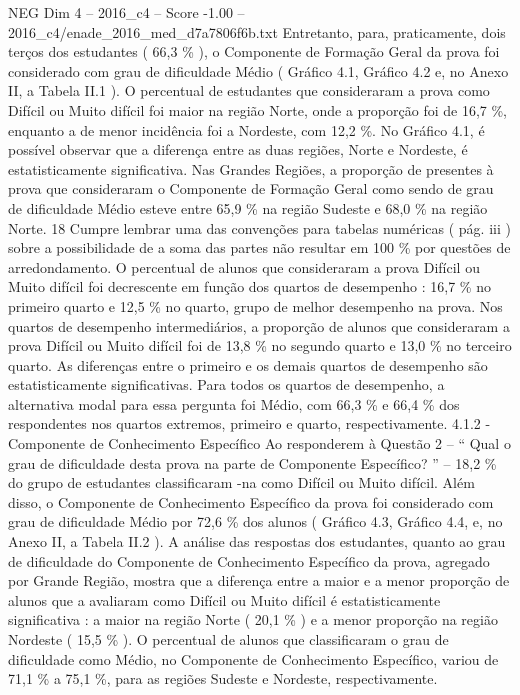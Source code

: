 \begin{textsample}{NEG Dim 4 – 2016\_c4 – Score -1.00 – 2016\_c4/enade\_2016\_med\_d7a7806f6b.txt}
Entretanto, para, praticamente, dois terços dos estudantes ( 66,3 \% ), o Componente de Formação Geral da prova foi considerado com grau de dificuldade Médio ( Gráfico 4.1, Gráfico 4.2 e, no Anexo II, a Tabela II.1 ).
O percentual de estudantes que consideraram a prova como Difícil ou Muito difícil foi maior na região Norte, onde a proporção foi de 16,7 \%, enquanto a de menor incidência foi a Nordeste, com 12,2 \%.
No Gráfico 4.1, é possível observar que a diferença entre as duas regiões, Norte e Nordeste, é estatisticamente significativa.
Nas Grandes Regiões, a proporção de presentes à prova que consideraram o Componente de Formação Geral como sendo de grau de dificuldade Médio esteve entre 65,9 \% na região Sudeste e 68,0 \% na região Norte. 18 Cumpre lembrar uma das convenções para tabelas numéricas ( pág. iii ) sobre a possibilidade de a soma das partes não resultar em 100 \% por questões de arredondamento.
O percentual de alunos que consideraram a prova Difícil ou Muito difícil foi decrescente em função dos quartos de desempenho : 16,7 \% no primeiro quarto e 12,5 \% no quarto, grupo de melhor desempenho na prova.
Nos quartos de desempenho intermediários, a proporção de alunos que consideraram a prova Difícil ou Muito difícil foi de 13,8 \% no segundo quarto e 13,0 \% no terceiro quarto.
As diferenças entre o primeiro e os demais quartos de desempenho são estatisticamente significativas.
Para todos os quartos de desempenho, a alternativa modal para essa pergunta foi Médio, com 66,3 \% e 66,4 \% dos respondentes nos quartos extremos, primeiro e quarto, respectivamente. 4.1.2 - Componente de Conhecimento Específico Ao responderem à Questão 2 – “ Qual o grau de dificuldade desta prova na parte de Componente Específico? ” – 18,2 \% do grupo de estudantes classificaram -na como Difícil ou Muito difícil.
Além disso, o Componente de Conhecimento Específico da prova foi considerado com grau de dificuldade Médio por 72,6 \% dos alunos ( Gráfico 4.3, Gráfico 4.4, e, no Anexo II, a Tabela II.2 ).
A análise das respostas dos estudantes, quanto ao grau de dificuldade do Componente de Conhecimento Específico da prova, agregado por Grande Região, mostra que a diferença entre a maior e a menor proporção de alunos que a avaliaram como Difícil ou Muito difícil é estatisticamente significativa : a maior na região Norte ( 20,1 \% ) e a menor proporção na região Nordeste ( 15,5 \% ).
O percentual de alunos que classificaram o grau de dificuldade como Médio, no Componente de Conhecimento Específico, variou de 71,1 \% a 75,1 \%, para as regiões Sudeste e Nordeste, respectivamente.

\end{textsample}
